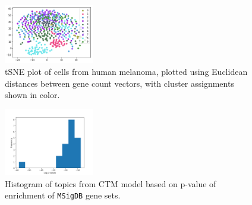 \documentclass{article}
\begin{document}
\begin{figure}
    \centering
    \includegraphics[width=0.35\textwidth]{figs/unclustered}
    \caption{tSNE plot of cells from human melanoma, plotted using Euclidean distances between gene count vectors, with cluster assignments shown in color.}
    \label{fig:unclustered}
\end{figure}

\begin{figure}
    \centering
    \includegraphics[width=0.35\textwidth]{figs/ctm_pvals}
    \caption{Histogram of topics from CTM model based on p-value of enrichment of \texttt{MSigDB} gene sets.}
    \label{fig:ctm_pvals}
\end{figure}
\end{document}
